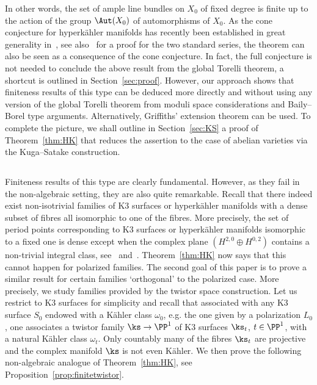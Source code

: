 In other words, the set of ample line bundles on $X_0$ of fixed degree is finite up to the action of the group $\Aut(X_0)$ of automorphisms of $X_0$. As the cone conjecture for hyperk\"ahler manifolds has recently been established in great generality in~\cite{AmVerb,AmVerb2}, see also~\cite{MarYos} for a proof for the two standard series, the theorem can also be seen as a consequence of the cone conjecture. In fact, the full conjecture is not needed to conclude the above result from the global Torelli theorem, a shortcut is outlined in Section~\ref{sec:proof}. However, our approach shows that finiteness results of this type can be deduced more directly and without using any version of the global Torelli theorem from moduli space considerations and Baily--Borel type arguments. Alternatively, Griffiths' extension theorem can be used. To complete the picture, we shall outline in Section~\ref{sec:KS} a proof of Theorem~\ref{thm:HK} that reduces the assertion to the case of abelian varieties via the Kuga--Satake construction.

\pagebreak
\subsection{}
Finiteness results of this type are clearly fundamental. However, as they fail in the non-algebraic setting, they are also quite remarkable. Recall that there indeed exist non-isotrivial families of K3 surfaces or hyperk\"ahler manifolds with a dense subset of fibres all isomorphic to one of the fibres. More precisely, the set of period points corresponding to K3 surfaces or hyperk\"ahler manifolds isomorphic to a fixed one is dense except when the complex plane $(H^{2,0}\oplus H^{0,2})$ contains a non-trivial integral class, see~\cite{Verb2,Verb3} and~\cite[Remark~5.7]{BL}. Theorem~\ref{thm:HK} now says that this cannot happen for polarized families. The second goal of this paper is to prove a similar result for certain families `orthogonal' to the polarized case. More precisely, we study families provided by the twistor space construction. Let us restrict to K3 surfaces for simplicity and recall that associated with any K3 surface $S_0$ endowed with a K\"ahler class $\omega_0$, e.g. the one given by a polarization $L_0$, one associates a twistor family $\ks\to\PP^1$ of K3 surfaces $\ks_t$, $t\in\PP^1$, with a natural K\"ahler class $\omega_t$. Only countably many of the fibres $\ks_t$ are projective and the complex manifold $\ks$ is not even K\"ahler. We then prove the following non-algebraic analogue of Theorem~\ref{thm:HK}, see Proposition~\ref{prop:finitetwistor}.

